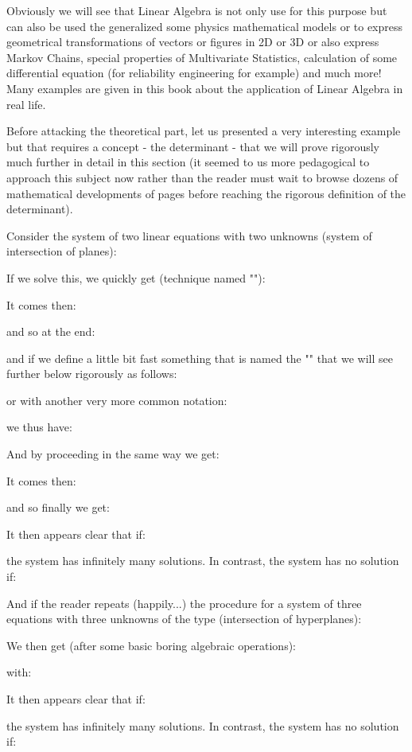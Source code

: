 	Obviously we will see that Linear Algebra is not only use for this purpose but can also be used the generalized some physics mathematical models or to express geometrical transformations of vectors or figures in 2D or 3D or also express Markov Chains, special properties of Multivariate Statistics, calculation of some differential equation (for reliability engineering for example) and much more! Many examples are given in this book about the application of Linear Algebra in real life.

Before attacking the theoretical part, let us presented a very interesting example but that requires a concept - the determinant - that we will prove rigorously much further in detail in this section (it seemed to us more pedagogical to approach this subject now rather than the reader must wait to browse dozens of mathematical developments of pages before reaching the rigorous definition of the determinant).

Consider the system of two linear equations with two unknowns (system of intersection of planes):
	
If we solve this, we quickly get (technique named ""):
	
It comes then:
	
and so at the end:
	
and if we define a little bit fast something that is named the "" that we will see further below rigorously as follows:
	
or with another very more common notation:
	
we thus have:
	
And by proceeding in the same way we get:
	
It comes then:
	
and so finally we get:
	
It then appears clear that if:
		
the system has infinitely many solutions. In contrast, the system has no solution if:
	
And if the reader repeats (happily...) the procedure for a system of three equations with three unknowns of the type (intersection of hyperplanes):
	
We then get (after some basic boring algebraic operations):
	
with:
	
	It then appears clear that if:
	
	the system has infinitely many solutions. In contrast, the system has no solution if:
	
